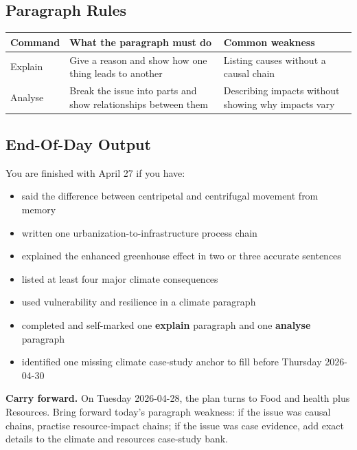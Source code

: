 \documentclass[11pt,a4paper]{article}
\newcommand{\exam}[1]{\textcolor{AccentTeal}{\textbf{#1}}}
\newcommand{\boxnote}[3]{%
\noindent\colorbox{#1}{%
  \begin{minipage}{0.965\textwidth}
  \sffamily
  \textbf{\textcolor{HeadingBlue}{#2}} #3
  \end{minipage}
}}
\begin{document}
\subsection{Paragraph Rules}

\begin{tabularx}{\textwidth}{L{0.17\textwidth}Y Y}
\toprule
\textbf{Command} & \textbf{What the paragraph must do} & \textbf{Common weakness} \\
\midrule
Explain & Give a reason and show how one thing leads to another & Listing
causes without a causal chain \\
Analyse & Break the issue into parts and show relationships between them &
Describing impacts without showing why impacts vary \\
\bottomrule
\end{tabularx}

\subsection{End-Of-Day Output}

You are finished with April 27 if you have:

\begin{itemize}
  \item said the difference between centripetal and centrifugal movement from
  memory
  \item written one urbanization-to-infrastructure process chain
  \item explained the enhanced greenhouse effect in two or three accurate
  sentences
  \item listed at least four major climate consequences
  \item used vulnerability and resilience in a climate paragraph
  \item completed and self-marked one \exam{explain} paragraph and one
  \exam{analyse} paragraph
  \item identified one missing climate case-study anchor to fill before
  Thursday 2026-04-30
\end{itemize}

\boxnote{SoftGreen}{Carry forward.}{On Tuesday 2026-04-28, the plan turns to
Food and health plus Resources. Bring forward today's paragraph weakness: if
the issue was causal chains, practise resource-impact chains; if the issue was
case evidence, add exact details to the climate and resources case-study bank.}
\end{document}
